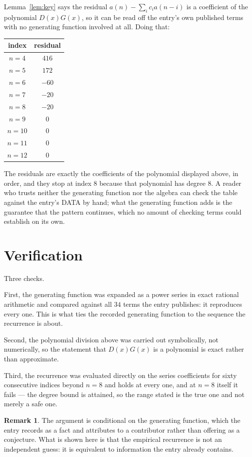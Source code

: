 \documentclass[11pt,a4paper]{article}
\theoremstyle{plain}
\theoremstyle{definition}
\newtheorem{remark}[theorem]{Remark}
\begin{document}
Lemma~\ref{lem:key} says the residual $a(n)-\sum_ic_ia(n-i)$ is a coefficient of the
polynomial $D(x)G(x)$, so it can be read off the entry's own published terms with no
generating function involved at all. Doing that:
\begin{center}
\begin{tabular}{cc}
index & residual \\ \hline
$n=4$ & $416$ \\
$n=5$ & $172$ \\
$n=6$ & $-60$ \\
$n=7$ & $-20$ \\
$n=8$ & $-20$ \\
$n=9$ & $0$ \\
$n=10$ & $0$ \\
$n=11$ & $0$ \\
$n=12$ & $0$
\end{tabular}
\end{center}
The residuals are exactly the coefficients of the polynomial displayed above, in order, and
they stop at index $8$ because that polynomial has degree $8$. A reader who trusts
neither the generating function nor the algebra can check the table against the entry's DATA
by hand; what the generating function adds is the guarantee that the pattern continues, which
no amount of checking terms could establish on its own.

\section{Verification}

Three checks.

First, the generating function was expanded as a power series in exact rational arithmetic and
compared against all $34$ terms the entry publishes: it reproduces every one. This is
what ties the recorded generating function to the sequence the recurrence is about.

Second, the polynomial division above was carried out symbolically, not numerically, so the
statement that $D(x)G(x)$ is a polynomial is exact rather than approximate.

Third, the recurrence was evaluated directly on the series coefficients for sixty consecutive
indices beyond $n=8$ and holds at every one, and at $n=8$ itself it fails --- the
degree bound is attained, so the range stated is the true one and not merely a safe one.

\begin{remark}
The argument is conditional on the generating function, which the entry records as a fact and
attributes to a contributor rather than offering as a conjecture. What is shown here is that
the empirical recurrence is not an independent guess: it is equivalent to information the
entry already contains.
\end{remark}
\end{document}
